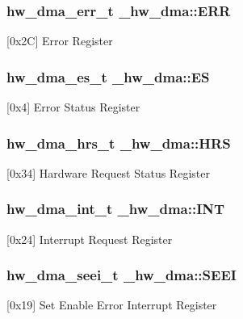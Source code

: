\subsubsection[{\texorpdfstring{E\+RR}{ERR}}]{ {\bf hw\+\_\+dma\+\_\+err\+\_\+t} \+\_\+hw\+\_\+dma\+::\+E\+RR}\hypertarget{struct__hw__dma_a689a08c0b19fcc38e676ae59040a2640}{}\label{struct__hw__dma_a689a08c0b19fcc38e676ae59040a2640}
\mbox{[}0x2C\mbox{]} Error Register 
\subsubsection[{\texorpdfstring{ES}{ES}}]{ {\bf hw\+\_\+dma\+\_\+es\+\_\+t} \+\_\+hw\+\_\+dma\+::\+ES}\hypertarget{struct__hw__dma_a92a8e5a0c21479b7e9890a61f2c96e84}{}\label{struct__hw__dma_a92a8e5a0c21479b7e9890a61f2c96e84}
\mbox{[}0x4\mbox{]} Error Status Register 
\subsubsection[{\texorpdfstring{H\+RS}{HRS}}]{ {\bf hw\+\_\+dma\+\_\+hrs\+\_\+t} \+\_\+hw\+\_\+dma\+::\+H\+RS}\hypertarget{struct__hw__dma_a7cc18d693dc6215c152e9da1db62fc2c}{}\label{struct__hw__dma_a7cc18d693dc6215c152e9da1db62fc2c}
\mbox{[}0x34\mbox{]} Hardware Request Status Register 
\subsubsection[{\texorpdfstring{I\+NT}{INT}}]{ {\bf hw\+\_\+dma\+\_\+int\+\_\+t} \+\_\+hw\+\_\+dma\+::\+I\+NT}\hypertarget{struct__hw__dma_a9b82e1c41eb21e218128a85ab4923aa3}{}\label{struct__hw__dma_a9b82e1c41eb21e218128a85ab4923aa3}
\mbox{[}0x24\mbox{]} Interrupt Request Register 
\subsubsection[{\texorpdfstring{S\+E\+EI}{SEEI}}]{ {\bf hw\+\_\+dma\+\_\+seei\+\_\+t} \+\_\+hw\+\_\+dma\+::\+S\+E\+EI}\hypertarget{struct__hw__dma_a97cf019cb2cd1c7c10cdedd6b132bcaa}{}\label{struct__hw__dma_a97cf019cb2cd1c7c10cdedd6b132bcaa}
\mbox{[}0x19\mbox{]} Set Enable Error Interrupt Register 
